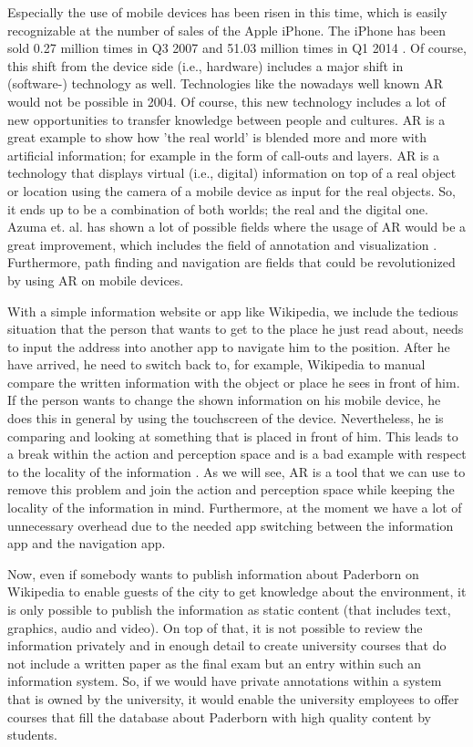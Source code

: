 \documentclass[a4page]{article}
\begin{document}
Especially the use of mobile devices has been risen in this time, which is easily recognizable at the number of sales of the Apple iPhone. The iPhone has been sold 0.27 million times in Q3 2007 and 51.03 million times in Q1 2014 \cite{statIPhone}. Of course, this shift from the device side (i.e., hardware) includes a major shift in (software-) technology as well. Technologies like the nowadays well known \ac{AR} would not be possible in 2004. Of course, this new technology includes a lot of new opportunities to transfer knowledge between people and cultures. \ac{AR} is a great example to show how 'the real world' is blended more and more with artificial information; for example in the form of call-outs and layers. \ac{AR} is a technology that displays virtual (i.e., digital) information on top of a real object or location using the camera of a mobile device as input for the real objects. So, it ends up to be a combination of both worlds; the real and the digital one. Azuma et. al. has shown a lot of possible fields where the usage of \ac{AR} would be a great improvement, which includes the field of annotation and visualization \cite{Azu97}. Furthermore, path finding and navigation are fields that could be revolutionized by using \ac{AR} on mobile devices.

With a simple information website or app like Wikipedia, we include the tedious situation that the person that wants to get to the place he just read about, needs to input the address into another app to navigate him to the position. After he have arrived, he need to switch back to, for example, Wikipedia to manual compare the written information with the object or place he sees in front of him. If the person wants to change the shown information on his mobile device, he does this in general by using the touchscreen of the device. Nevertheless, he is comparing and looking at something that is placed in front of him. This leads to a break within the action and perception space \cite{ham01} and is a bad example with respect to the locality of the information \cite{Bon10}. As we will see, \ac{AR} is a tool that we can use to remove this problem and join the action and perception space while keeping the locality of the information in mind.  Furthermore, at the moment we have a lot of unnecessary overhead due to the needed app switching between the information app and the navigation app.   

Now, even if somebody wants to publish information about Paderborn on Wikipedia to enable guests of the city to get knowledge about the environment, it is only possible to publish the information as static content (that includes text, graphics, audio and video). On top of that, it is not possible to review the information privately and in enough detail to create university courses that do not include a written paper as the final exam but an entry within such an information system.  So, if we would have private annotations within a system that is owned by the university, it would enable the university employees to offer courses that fill the database about Paderborn with high quality content by students.
\end{document}
